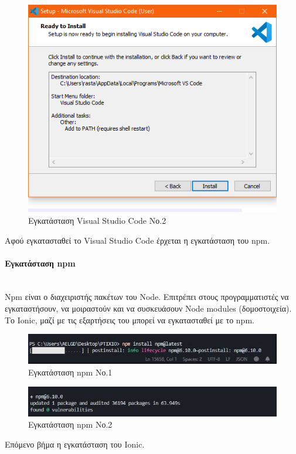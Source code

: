 \documentclass[a4paper,12pt]{article}
\newcommand{\myparagraph}[1]{\paragraph{#1}\mbox{}\\}
\begin{document}
				\begin{figure}[!htb]
					\begin{center}
						\caption{Εγκατάσταση Visual Studio Code Νο.2}
						\vspace*{0.5cm}
						\includegraphics[width=0.9\linewidth]{vsc} 
					\end{center}
				\end{figure}

				\newpage
				Αφού εγκατασταθεί το Visual Studio Code έρχεται η εγκατάσταση του npm.
				
				\myparagraph{Εγκατάσταση npm}
				Npm είναι ο διαχειριστής πακέτων του Node. Επιτρέπει στους προγραμματιστές να εγκαταστήσουν, να μοιραστούν και να συσκευάσουν Node modules (δομοστοιχεία).  
				Το Ionic, μαζί με τις εξαρτήσεις του μπορεί να εγκατασταθεί με το npm.
				
				\begin{figure}[!htb]
					\begin{center}
						\caption{Εγκατάσταση npm Νο.1}
						\vspace*{0.5cm}
						\includegraphics[width=\linewidth]{npm1} 
					\end{center}
				\end{figure}

				\begin{figure}[!htb]
					\begin{center}
						\caption{Εγκατάσταση npm Νο.2}
						\vspace*{0.5cm}
						\includegraphics[width=\linewidth]{npm2} 
					\end{center}
				\end{figure}
				Επόμενο βήμα η εγκατάσταση του Ionic.
	
\end{document}
